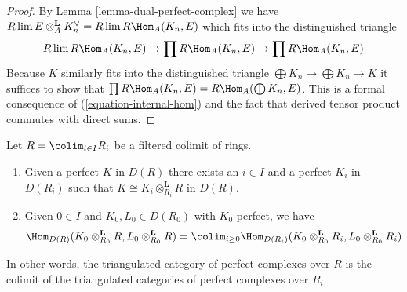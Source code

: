 \begin{proof}
By Lemma \ref{lemma-dual-perfect-complex} we have
$R\lim E \otimes^\mathbf{L}_A K_n^\vee =
R\lim R\Hom_A(K_n, E)$
which fits into the distinguished triangle
$$
R\lim R\Hom_A(K_n, E) \to
\prod R\Hom_A(K_n, E) \to
\prod R\Hom_A(K_n, E)
$$
Because $K$ similarly fits into the distinguished triangle
$\bigoplus K_n \to \bigoplus K_n \to K$ it suffices to show that
$\prod R\Hom_A(K_n, E) = R\Hom_A(\bigoplus K_n, E)$.
This is a formal consequence of (\ref{equation-internal-hom})
and the fact that derived tensor product commutes with direct sums.
\end{proof}

\begin{lemma}
\label{lemma-colimit-perfect-complexes}
Let $R = \colim_{i \in I} R_i$ be a filtered colimit of rings.
\begin{enumerate}
\item Given a perfect $K$ in $D(R)$ there exists an $i \in I$
and a perfect $K_i$ in $D(R_i)$ such that
$K \cong K_i \otimes_{R_i}^\mathbf{L} R$ in $D(R)$.
\item Given $0 \in I$ and $K_0, L_0 \in D(R_0)$ with $K_0$ perfect,
we have
$$
\Hom_{D(R)}(K_0 \otimes_{R_0}^\mathbf{L} R, L_0 \otimes_{R_0}^\mathbf{L} R) =
\colim_{i \geq 0}
\Hom_{D(R_i)}(K_0 \otimes_{R_0}^\mathbf{L} R_i,
L_0 \otimes_{R_0}^\mathbf{L} R_i)
$$
\end{enumerate}
In other words, the triangulated category of perfect complexes over $R$
is the colimit of the triangulated categories of perfect complexes over $R_i$.
\end{lemma}

